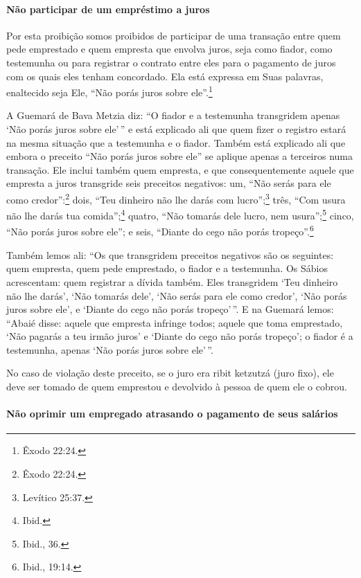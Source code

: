 \begin{multicols}{2}
\paragraph{Não participar de um empréstimo a juros}

Por esta proibição somos proibidos de participar de uma transação entre
quem pede emprestado e quem empresta que envolva juros, seja como
fiador, como testemunha ou para registrar o contrato entre eles para o
pagamento de juros com os quais eles tenham concordado. Ela está
expressa em Suas palavras, enaltecido seja Ele, ``Não porás juros sobre
ele''.\footnote{Êxodo 22:24.}

A Guemará\starr{} de Bava Metzia\starr{} diz: ``O fiador e a testemunha transgridem
apenas `Não porás juros sobre ele'\,'' e está explicado ali que quem fizer
o registro estará na mesma situação que a testemunha e o fiador. Também
está explicado ali que embora o preceito ``Não porás juros sobre ele''
se aplique apenas a terceiros numa transação. Ele inclui também quem
empresta, e que consequentemente aquele que empresta a juros transgride
seis preceitos negativos: um, ``Não serás para ele como credor'':\footnote{Êxodo
22:24.} dois, ``Teu dinheiro não lhe darás com lucro'';\footnote{Levítico
25:37.} três, ``Com usura não lhe darás tua comida'';\footnote{Ibid.} quatro,
``Não tomarás dele lucro, nem usura'';\footnote{Ibid., 36.} cinco, ``Não porás
juros sobre ele''; e seis, ``Diante do cego não porás tropeço''.\footnote{Ibid.,
19:14.}

Também lemos ali: ``Os que transgridem preceitos negativos são os
seguintes: quem empresta, quem pede emprestado, o fiador e a testemunha.
Os Sábios acrescentam: quem registrar a dívida também. Eles transgridem
`Teu dinheiro não lhe darás', `Não tomarás dele', `Não serás para ele
como credor', `Não porás juros sobre ele', e `Diante do cego não porás
tropeço'\,''. E na Guemará\starr{} lemos: ``Abaié\starr{} disse: aquele que empresta
infringe todos; aquele que toma emprestado, `Não pagarás a teu irmão
juros' e `Diante do cego não porás tropeço'; o fiador é a testemunha,
apenas `Não porás juros sobre ele'\,''.

No caso de violação deste preceito, se o juro era ribit ketzutzá\starr{}
(juro fixo), ele deve ser tomado de quem emprestou e devolvido à pessoa
de quem ele o cobrou.

\paragraph{Não oprimir um empregado atrasando o pagamento de seus salários}


\end{multicols}
